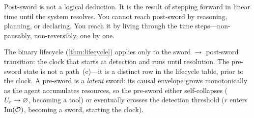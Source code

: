 \begin{remark}
\textcolor{sword}{Post-sword is not a logical deduction.
It is the result of stepping forward in linear time until the
system resolves.  You cannot reach post-sword by reasoning,
planning, or declaring.  You reach it by living through the
time steps---non-pausably, non-reversibly, one by one.}

The binary lifecycle (\cref{thm:lifecycle}) applies only to the
sword $\to$ post-sword transition: the clock that starts at
detection and runs until resolution.  The pre-sword state is not a
path~(c)---it is a distinct row in the lifecycle table, prior to
the clock.  A pre-sword is a \emph{latent} sword: its causal
envelope grows monotonically as the agent accumulates resources,
so the pre-sword either self-collapses ($U_r \to \varnothing$,
becoming a tool) or eventually crosses the detection threshold
($r$ enters $\mathrm{Im}(\mathcal{O})$, becoming a sword, starting
the clock).
\end{remark}


